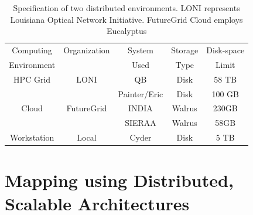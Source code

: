 \documentclass{sig-alternate}
\begin{document}
\begin{table}
\small
\begin{tabular}{|c|c|c|c|c|} 
\hline 
Computing & Organization & System &  Storage & Disk-space  \\
Environment & & Used & Type  &  Limit \\ \hline
HPC Grid & LONI & QB & Disk & 58 TB   \\
 &  &  Painter/Eric  & Disk &  100 GB  \\
Cloud & FutureGrid & INDIA & Walrus & 230GB \\
         &                    &  SIERAA & Walrus & 58GB \\ 
Workstation &  Local   &  Cyder & Disk       & 5 TB\\

 \hline


 \end{tabular}
\caption{Specification of two distributed environments. LONI represents Louisiana Optical Network Initiative\cite{loni}. FutureGrid Cloud\cite{futuregrid} employs Eucalyptus}
\label{table:two-systems} 
\end{table}




\section{Mapping using Distributed, Scalable Architectures}



\end{document}
